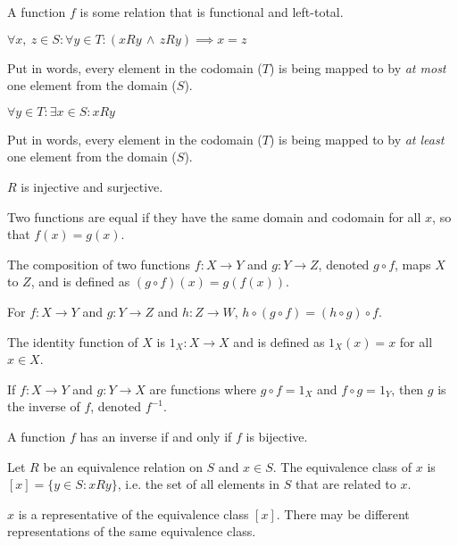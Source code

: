 \documentclass{article}
\begin{document}
\begin{definition}
    A function $f$ is some relation that is functional and left-total.
\end{definition}
%
\begin{tcolorboxlarge}[title={Function Properties}]
    \begin{description}[style=sameline]
        \item[Injective (one-to-one)]
            $\forall x,\: z \in S : \forall y \in T
                : (xRy \,\land\, zRy) \implies x = z$

            Put in words, every element in the codomain ($T$)
            is being mapped to by \textit{at most} one element from the domain ($S$).
        \item[Surjective (onto)]
            $\forall y \in T : \exists x \in S : xRy$

            Put in words, every element in the codomain ($T$)
            is being mapped to by \textit{at least} one element from the domain ($S$).
        \item[Bijective]
            $R$ is injective and surjective.
    \end{description}
\end{tcolorboxlarge}
%
\begin{definition}
    Two functions are equal if they have the same domain and codomain
    for all $x$, so that $f(x) = g(x)$.
\end{definition}
%
\begin{definition}
    The composition of two functions $f:X \to Y$ and $g:Y \to Z$,
    denoted $g \circ f$, maps $X$ to $Z$, and is defined as
    $(g \circ f)(x) = g(f(x))$.
\end{definition}
%
\begin{theorem}
    For $f:X \to Y$ and $g:Y \to Z$ and  $h:Z \to W$,
    $h \circ (g \circ f) = (h \circ g) \circ f$.
\end{theorem}
%
\begin{definition}
    The identity function of $X$ is $1_X:X \to X$ and is defined as
    $1_X (x)=x$ for all $x \in X$.
\end{definition}
%
\begin{definition}
    If $f:X \to Y$ and $g:Y \to X$ are functions where
    $g \circ f = 1_X$ and $f \circ g = 1_Y$,
    then $g$ is the inverse of $f$, denoted $f^{-1}$.
\end{definition}
%
\begin{theorem}
    A function $f$ has an inverse if and only if $f$ is bijective.
\end{theorem}
%
\begin{definition}
    Let $R$ be an equivalence relation on $S$ and $x \in S$.
    The equivalence class of $x$ is $[x] = \{y \in S : xRy\}$,
    i.e. the set of all elements in $S$ that are related to $x$.

    $x$ is a representative of the equivalence class $[x]$.
    There may be different representations of the same equivalence class.
\end{definition}
%
\end{document}
